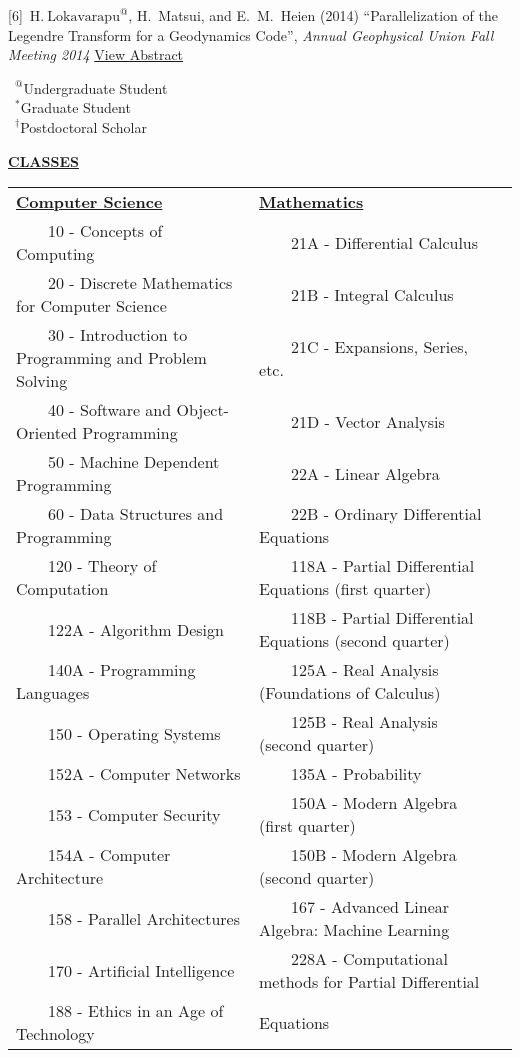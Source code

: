 \documentclass[11pt]{ltxdoc}
\newcommand{\tabitem}{~~\llap{\textbullet}~~}
\begin{document}
\hangindent 20pt
[6]~$\mathrm{H.~Lokavarapu}^{@}$, H.~Matsui, and E.~M.~Heien (2014) 
``Parallelization of the Legendre Transform for a Geodynamics Code'', 
\textit{Annual Geophysical Union Fall Meeting 2014}
\href{http://adsabs.harvard.edu/abs/2014AGUFMDI11A4255L}{View Abstract}

\vskip 18pt

$\phantom{0}^@$Undergraduate Student        \\
$\phantom{0}^*$Graduate Student             \\
$\phantom{0}^{\dagger}$Postdoctoral Scholar

\newpage

\begin{center}
  \textbf{\underline{CLASSES}}
\end{center}

\vskip -6pt

\begin{tabular}{lll}
  \textbf{\underline{Computer Science}} & \textbf{\underline{Mathematics}} \\[12pt]
  \tabitem 10 - Concepts of Computing & \tabitem 21A - Differential Calculus \\
  \tabitem 20 - Discrete Mathematics for Computer Science & 	\tabitem 21B - Integral Calculus \\
  \tabitem 30 - Introduction to Programming and Problem Solving & 	\tabitem 21C - Expansions, Series, etc. \\
  \tabitem 40 - Software and Object-Oriented Programming & 	\tabitem 21D - Vector Analysis \\
  \tabitem 50 - Machine Dependent Programming & 	\tabitem 22A - Linear Algebra \\
  \tabitem 60 - Data Structures and Programming & 	\tabitem 22B - Ordinary Differential Equations \\
  \tabitem 120 - Theory of Computation & 	\tabitem 118A - Partial Differential Equations   (first quarter) \\
  \tabitem 122A - Algorithm Design & 	\tabitem 118B - Partial Differential Equations   (second quarter) \\
  \tabitem 140A - Programming Languages & 	\tabitem 125A - Real Analysis (Foundations of Calculus) \\
  \tabitem 150 - Operating Systems & 	\tabitem 125B - Real Analysis (second quarter) \\
  \tabitem 152A - Computer Networks & 	\tabitem 135A - Probability \\
  \tabitem 153 - Computer Security & 	\tabitem 150A - Modern Algebra (first quarter) \\
  \tabitem 154A - Computer Architecture & 	\tabitem 150B - Modern Algebra (second quarter) \\
  \tabitem 158 - Parallel Architectures & 	\tabitem 167  - Advanced Linear Algebra: Machine Learning \\
  \tabitem 170 - Artificial Intelligence & 	\tabitem 228A - Computational methods for Partial Differential \\
  \tabitem 188 - Ethics in an Age of Technology & \qquad\qquad Equations
\end{tabular}
\end{document}
